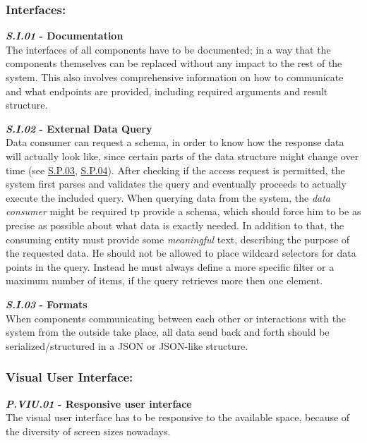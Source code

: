 \documentclass[12pt,english,a4paper,titlepage,cleardoublepage=empty,dottedtoc]{report}
\begin{document}
\subsubsection{Interfaces:}\label{interfaces}

\textbf{\emph{\protect\hypertarget{si01}{}{S.I.01}} - Documentation}\\
The interfaces of all components have to be documented; in a way that
the components themselves can be replaced without any impact to the rest
of the system. This also involves comprehensive information on how to
communicate and what endpoints are provided, including required
arguments and result structure.

\textbf{\emph{\protect\hypertarget{si02}{}{S.I.02}} - External Data
Query}\\
Data consumer can request a schema, in order to know how the response
data will actually look like, since certain parts of the data structure
might change over time (see \protect\hyperlink{sp03}{S.P.03},
\protect\hyperlink{sp04}{S.P.04}). After checking if the access request
is permitted, the system first parses and validates the query and
eventually proceeds to actually execute the included query. When
querying data from the system, the \emph{data consumer} might be
required tp provide a schema, which should force him to be as precise as
possible about what data is exactly needed. In addition to that, the
consuming entity must provide some \emph{meaningful} text, describing
the purpose of the requested data. He should not be allowed to place
wildcard selectors for data points in the query. Instead he must always
define a more specific filter or a maximum number of items, if the query
retrieves more then one element.

\textbf{\emph{\protect\hypertarget{si03}{}{S.I.03}} - Formats}\\
When components communicating between each other or interactions with
the system from the outside take place, all data send back and forth
should be serialized/structured in a JSON or JSON-like structure.

\subsubsection{Visual User Interface:}\label{visual-user-interface}

\textbf{\emph{\protect\hypertarget{pviu01}{}{P.VIU.01}} - Responsive
user interface}\\
The visual user interface has to be responsive to the available space,
because of the diversity of screen sizes nowadays.
\end{document}
